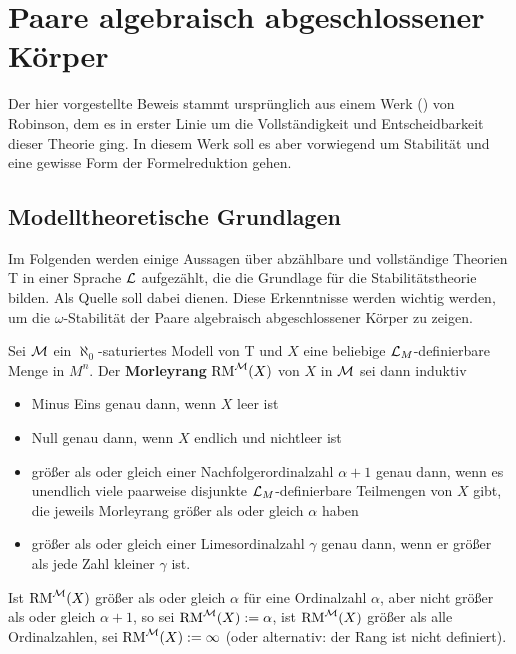 	\chapter{Paare algebraisch abgeschlossener Körper}
	Der hier vorgestellte Beweis stammt ursprünglich aus einem Werk (\cite{Robinson}) von Robinson, dem es in erster Linie um die Vollständigkeit und Entscheidbarkeit dieser Theorie ging. In diesem Werk soll es aber vorwiegend um Stabilität und eine gewisse Form der Formelreduktion gehen.
	
	\section{Modelltheoretische Grundlagen}
	Im Folgenden werden einige Aussagen über abzählbare und vollständige Theorien T in einer Sprache $\mathcal{L}$ aufgezählt, die die Grundlage für die Stabilitätstheorie bilden. Als Quelle soll dabei \cite{Marker} dienen. Diese Erkenntnisse werden wichtig werden, um die $\omega$-Stabilität der Paare algebraisch abgeschlossener Körper zu zeigen.
	
	\begin{definition}
		Sei $\mathcal{M}$ ein $\aleph_0$-saturiertes Modell von T und $X$ eine beliebige $\mathcal{L}_M$-definierbare Menge in $M^n$. Der \textbf{Morleyrang} $\operatorname{RM}^{\mathcal{M}}(X)$ von $X$ in $\mathcal{M}$ sei dann induktiv
		\begin{itemize}
			\item Minus Eins genau dann, wenn $X$ leer ist
			\item Null genau dann, wenn $X$ endlich und nichtleer ist
			\item größer als oder gleich einer Nachfolgerordinalzahl $\alpha+1$ genau dann, wenn es unendlich viele paarweise disjunkte $\mathcal{L}_M$-definierbare Teilmengen von $X$ gibt, die jeweils Morleyrang größer als oder gleich $\alpha$ haben
			\item größer als oder gleich einer Limesordinalzahl $\gamma$ genau dann, wenn er größer als jede Zahl kleiner $\gamma$ ist.
		\end{itemize}
	    Ist $\operatorname{RM}^{\mathcal{M}}(X)$ größer als oder gleich $\alpha$ für eine Ordinalzahl $\alpha$, aber nicht größer als oder gleich $\alpha+1$, so sei $\operatorname{RM}^{\mathcal{M}}(X):=\alpha$, ist $\operatorname{RM}^{\mathcal{M}}(X)$ größer als alle Ordinalzahlen, sei $\operatorname{RM}^{\mathcal{M}}(X):=\infty$ (oder alternativ: der Rang ist nicht definiert).
	\end{definition}
	

